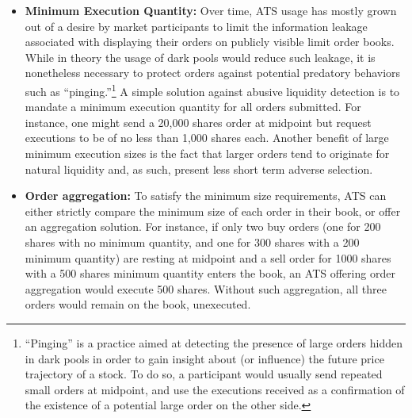 \begin{itemize}
\item{\textbf{Minimum Execution Quantity:}} Over time, ATS usage has mostly grown out of a desire by market participants to limit the information leakage associated with displaying their orders on publicly visible limit order books. While in theory the usage of dark pools would reduce such leakage, it is nonetheless necessary to protect orders against potential predatory behaviors such as ``pinging.''\footnote{``Pinging'' is a practice aimed at detecting the presence of large orders hidden in dark pools in order to gain insight about (or influence) the future price trajectory of a stock. To do so, a participant would usually send repeated small orders at midpoint, and use the executions received as a confirmation of the existence of a potential large order on the other side.} A simple solution against abusive liquidity detection is to mandate a minimum execution quantity for all orders submitted. For instance, one might send a 20,000 shares order at midpoint but request executions to be of no less than 1,000 shares each. Another benefit of large minimum execution sizes is the fact that larger orders tend to originate for natural liquidity and, as such, present less short term adverse selection.  

\item{\textbf{Order aggregation:}} To satisfy the minimum size requirements, ATS can either strictly compare the minimum size of each order in their book, or offer an aggregation solution. For instance, if only two buy orders (one for 200 shares with no minimum quantity, and one for 300 shares with a 200 minimum quantity) are resting at midpoint and a sell order for 1000 shares with a 500 shares minimum quantity enters the book, an ATS offering order aggregation would execute 500 shares. Without such aggregation, all three orders would remain on the book, unexecuted.


\end{itemize}
